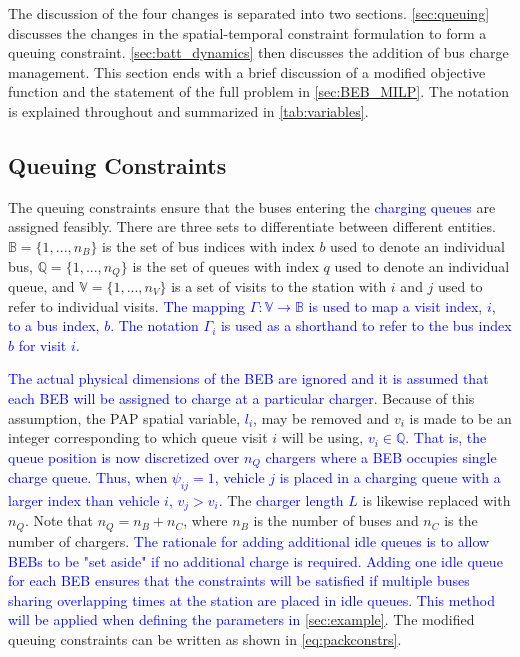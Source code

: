 \documentclass[utf8]{FrontiersinHarvard}
\begin{document}
The discussion of the four changes is separated into two sections. \autoref{sec:queuing} discusses the changes in the
spatial-temporal constraint formulation to form a queuing constraint. \autoref{sec:batt_dynamics} then discusses the
addition of bus charge management. This section ends with a brief discussion of a modified objective function and the
statement of the full problem in \autoref{sec:BEB_MILP}. The notation is explained throughout and summarized in
\autoref{tab:variables}.

\subsection{Queuing Constraints}
\label{sec:queuing}
\noindent The queuing constraints ensure that the buses entering the \textcolor{blue}{charging queues} are assigned
feasibly. There are three sets to differentiate between different entities. \(\mathbb{B} = \{1, ..., n_B\}\) is the set of
bus indices with index \(b\) used to denote an individual bus, \(\mathbb{Q} = \{1, ..., n_Q\}\) is the set of queues with index \(q\)
used to denote an individual queue, and \(\mathbb{V} = \{1, ..., n_V\}\) is a set of visits to the station with \(i\) and
\(j\) used to refer to individual visits. \textcolor{blue}{The mapping $\Gamma: \mathbb{V} \rightarrow \mathbb{B}$ is used to map a visit index, $i$, to a bus index, $b$. The notation $\Gamma_i$ is used as a shorthand to refer to the bus index $b$ for visit $i$.}

\textcolor{blue}{The actual physical dimensions of the BEB are ignored and it is assumed that each BEB will be assigned to charge at a particular charger}. Because of this assumption, the PAP spatial variable,
\textcolor{blue}{$l_i$}, may be removed and \(v_i\) is made to be an integer corresponding to which queue visit \(i\) will
be using, \textcolor{blue}{$v_i \in \mathbb{Q}$}. \textcolor{blue}{That is, the queue position is now discretized over $n_Q$ chargers where a BEB occupies single charge queue. Thus, when $\psi_{ij} = 1$, vehicle $j$ is placed in a charging queue with a larger index than vehicle $i$, $v_j > v_i$.} The \textcolor{blue}{charger length $L$} is
likewise replaced with \(n_Q\). Note that \(n_Q = n_B + n_C\), where \(n_B\) is the number of buses and \(n_C\) is the number of
chargers. \textcolor{blue}{The rationale for adding additional idle queues is to allow BEBs to be "set aside" if no additional charge is required. Adding one idle queue for each BEB ensures that the constraints will be satisfied if multiple buses sharing overlapping times at the station are placed in idle queues. This method will be applied when defining the parameters in {\autoref{sec:example}}}. The modified queuing constraints can be written as shown in
\autoref{eq:packconstrs}.
\end{document}
